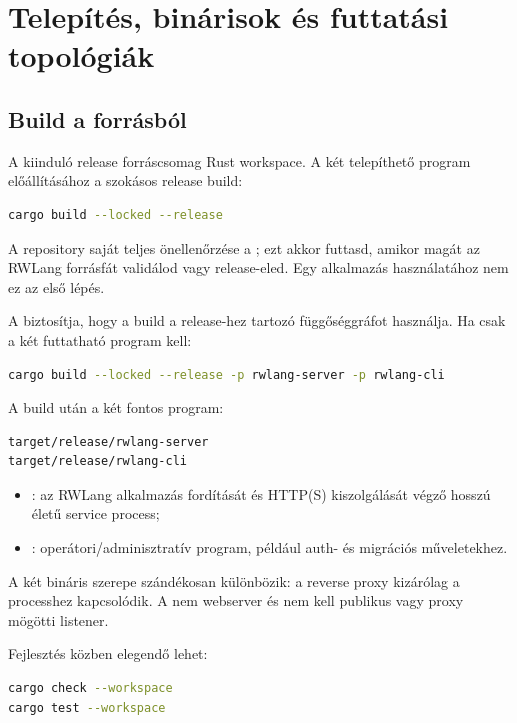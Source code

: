 \chapter{Telepítés, binárisok és futtatási topológiák}\label{ch:telepites}

\section{Build a forrásból}

A kiinduló release forráscsomag Rust workspace. A két telepíthető program előállításához a szokásos release build:

\begin{lstlisting}[language=bash]
cargo build --locked --release
\end{lstlisting}

A repository saját teljes önellenőrzése a ; ezt akkor futtasd, amikor magát az RWLang forrásfát validálod vagy release-eled. Egy alkalmazás használatához nem ez az első lépés.

A  biztosítja, hogy a build a release-hez tartozó  függőséggráfot használja. Ha csak a két futtatható program kell:

\begin{lstlisting}[language=bash]
cargo build --locked --release -p rwlang-server -p rwlang-cli
\end{lstlisting}

A build után a két fontos program:

\begin{lstlisting}
target/release/rwlang-server
target/release/rwlang-cli
\end{lstlisting}

\begin{itemize}
  \item {}: az RWLang alkalmazás fordítását és HTTP(S) kiszolgálását végző hosszú életű service process;
  \item {}: operátori/adminisztratív program, például auth- és migrációs műveletekhez.
\end{itemize}

A két bináris szerepe szándékosan különbözik: a reverse proxy kizárólag a  processhez kapcsolódik. A  nem webserver és nem kell publikus vagy proxy mögötti listener.

Fejlesztés közben elegendő lehet:

\begin{lstlisting}[language=bash]
cargo check --workspace
cargo test --workspace
\end{lstlisting}

